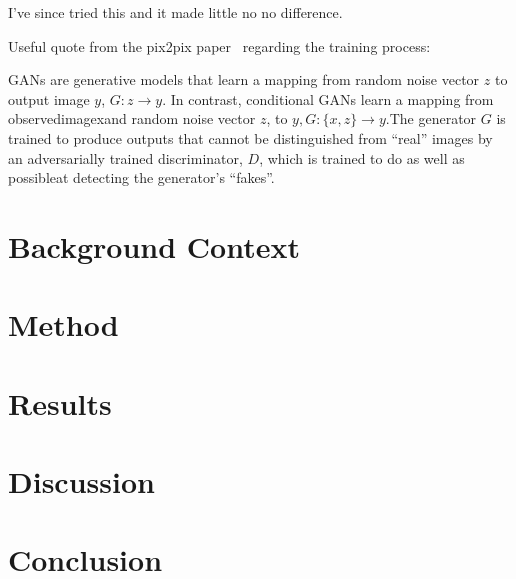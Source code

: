 \documentclass[a4paper]{article}
\begin{document}
I've since tried this and it made little no no difference.

Useful quote from the pix2pix paper~\cite{1611.07004} regarding the training process:

\begin{displayquote}
	GANs are generative models that learn a mapping from random noise vector $z$ to output image $y$, $G:z\rightarrow y$. In contrast, conditional GANs learn a mapping from observedimagexand random noise vector $z$, to $y,G:\{x,z\} \rightarrow y$.The generator $G$ is trained to produce outputs that cannot be distinguished from “real” images by an adversarially trained discriminator, $D$, which is trained to do as well as possibleat detecting the generator’s “fakes”.
\end{displayquote}



\nocite{*} %

\section{Background Context}

\section{Method}

\section{Results}

\section{Discussion}

\section{Conclusion}


\medskip
\printbibliography
\end{document}
